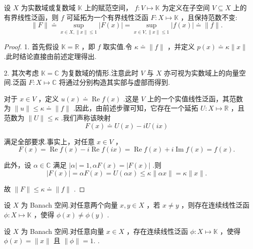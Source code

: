 \begin{theorem}[有界线性泛函的延拓定理]
设 $X$ 为实数域或复数域 $\mathbb{K}$ 上的赋范空间， $f : V \mapsto  \mathbb{K}$ 为定义在子空间 $V \subseteq  X$ 上的有界线性泛函，则 $f$ 可延拓为一个有界线性泛函 $F : X \mapsto  \mathbb{K}$ ，且保持范数不变:
\[
\| F\|  \doteq  \mathop{\sup }\limits_{{x \in  X,\| x\|  \leq  1}}\left| {F\left( x\right) }\right|  = \mathop{\sup }\limits_{{x \in  V,\| x\|  \leq  1}}\left| {f\left( x\right) }\right|  \doteq  \| f\| .
\]

\end{theorem}
\begin{proof}
1. 首先假设 $\mathbb{K} = \mathbb{R}$ ，即 $f$ 取实值.令 $\kappa  \doteq  \| f\|$ ，并定义 $p\left( x\right)  \doteq  \kappa \| x\|$ .此时结论直接由前述定理得出.

2. 其次考虑 $\mathbb{K} = \mathbb{C}$ 为复数域的情形.注意此时 $V$ 与 $X$ 亦可视为实数域上的向量空间.泛函 $F : X \mapsto  \mathbb{C}$ 将通过分别构造其实部与虚部而得到.

对于 $x \in  V$ ，定义 $u\left( x\right)  \doteq  \operatorname{Re}f\left( x\right)$ .这是 $V$ 上的一个实值线性泛函，其范数为 $\| u\|  \leq  \kappa  \doteq  \| f\|$ .因此，由前述步骤可知，它存在一个延拓 $U : X \mapsto  \mathbb{R}$ ，且范数为 $\| U\|  \leq  \kappa$ .我们声称该映射
\[
F\left( x\right)  \doteq  U\left( x\right)  - {iU}\left( {ix}\right)
\]

满足全部要求.事实上，对任意 $x \in  V$ ，
\[
F\left( x\right)  = \operatorname{Re}f\left( x\right)  - i\operatorname{Re}f\left( {ix}\right)  = \operatorname{Re}f\left( x\right)  + i\operatorname{Im}f\left( x\right)  = f\left( x\right) .
\]

此外，设 $\alpha  \in  \mathbb{C}$ 满足 $\left| \alpha \right|  = 1,{\alpha F}\left( x\right)  = \left| {F\left( x\right) }\right|$ .则
\[
\left| {F\left( x\right) }\right|  = {\alpha F}\left( x\right)  = U\left( {\alpha x}\right)  \leq  \kappa \| {\alpha x}\|  = \kappa \| x\| .
\]

故 $\| F\|  \leq  \kappa  \doteq  \| f\|$ .
\end{proof}

\begin{corollary}
设 $X$ 为 Banach 空间.对任意两个向量 $x,y \in  X$ ，若 $x \neq  y$ ，则存在连续线性泛函 $\phi  : X \mapsto  \mathbb{K}$ ，使得 $\phi \left( x\right)  \neq  \phi \left( y\right)$ .
\end{corollary}

\begin{corollary}
设 $X$ 为 Banach 空间.对任意向量 $x \in  X$ ，存在连续线性泛函 $\phi  : X \mapsto  \mathbb{K}$ ，使得 $\phi \left( x\right)  = \| x\|$ 且 $\| \phi \|  = 1.$ .
\end{corollary}

